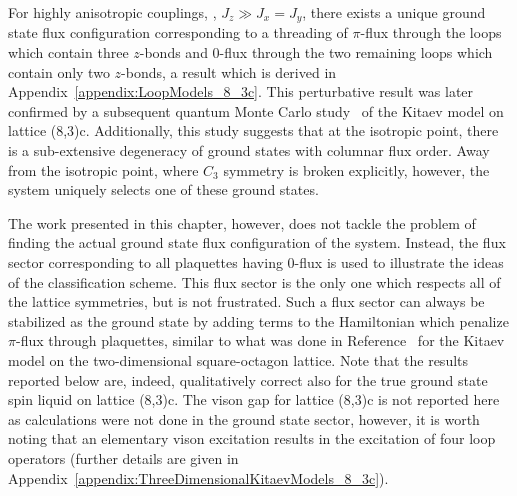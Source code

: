 For highly anisotropic couplings, \eg, $J_z \gg J_x = J_y$, there exists a unique ground state flux configuration corresponding to a threading of $\pi$-flux through the loops which contain three $z$-bonds and $0$-flux through the two remaining loops which contain only two $z$-bonds, a result which is derived in Appendix~\ref{appendix:LoopModels_8_3c}.
This perturbative result was later confirmed by a subsequent quantum Monte Carlo study~\cite{EschmannPRL2019} of the Kitaev model on lattice (8,3)c.
Additionally, this study suggests that at the isotropic point, there is a sub-extensive degeneracy of ground states with columnar flux order.
Away from the isotropic point, where $C_3$ symmetry is broken explicitly, however, the system uniquely selects one of these ground states.

The work presented in this chapter, however, does not tackle the problem of finding the actual ground state flux configuration of the system.
Instead, the flux sector corresponding to all plaquettes having $0$-flux is used to illustrate the ideas of the classification scheme.
This flux sector is the only one which respects all of the lattice symmetries, but is not frustrated.
Such a flux sector can always be stabilized as the ground state by adding terms to the Hamiltonian which penalize $\pi$-flux through plaquettes, similar to what was done in Reference~\cite{LaiPRB2011} for the Kitaev model on the two-dimensional square-octagon lattice.
Note that the results reported below are, indeed, qualitatively correct also for the true ground state spin liquid on lattice (8,3)c.
The vison gap for lattice (8,3)c is not reported here as calculations were not done in the ground state sector, however, it is worth noting that an elementary vison excitation results in the excitation of four loop operators (further details are given in Appendix~\ref{appendix:ThreeDimensionalKitaevModels_8_3c}).


%
%
